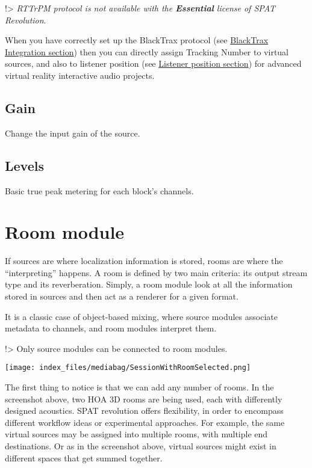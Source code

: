 \documentclass[
  letterpaper,
  DIV=11,
  numbers=noendperiod]{scrreport}
\begin{document}
!\textgreater{} \emph{RTTrPM protocol is not available with the
\textbf{Essential} license of SPAT Revolution}.

When you have correctly set up the BlackTrax protocol (see
\href{ThirdParty_BlackTrax.md}{BlackTrax Integration section}) then you
can directly assign Tracking Number to virtual sources, and also to
listener position (see
\href{Spatialisation_Technology_Listener_Position.md}{Listener position
section}) for advanced virtual reality interactive audio projects.

\hypertarget{gain}{%
\subsection{Gain}\label{gain}}

Change the input gain of the source.

\hypertarget{levels-1}{%
\subsection{Levels}\label{levels-1}}

Basic true peak metering for each block's channels.

\hypertarget{room-module}{%
\section{Room module}\label{room-module}}

If sources are where localization information is stored, rooms are where
the ``interpreting'' happens. A room is defined by two main criteria:
its output stream type and its reverberation. Simply, a room module look
at all the information stored in sources and then act as a renderer for
a given format.

It is a classic case of object-based mixing, where source modules
associate metadata to channels, and room modules interpret them.

!\textgreater{} Only source modules can be connected to room modules.

\texttt{[image: index\_files/mediabag/SessionWithRoomSelected.png]}

The first thing to notice is that we can add any number of rooms. In the
screenshot above, two HOA 3D rooms are being used, each with differently
designed acoustics. SPAT revolution offers flexibility, in order to
encompass different workflow ideas or experimental approaches. For
example, the same virtual sources may be assigned into multiple rooms,
with multiple end destinations. Or as in the screenshot above, virtual
sources might exist in different spaces that get summed together.
\end{document}
